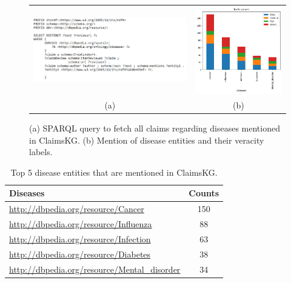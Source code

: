 \documentclass[
]{ceurart}
\begin{document}
\begin{figure}
   \begin{tabular}{cc}
         \includegraphics[width=0.65\linewidth]{table7.PNG} &\includegraphics[width=0.30\linewidth]{diseases.png}  \\
         (a) & (b) 
   \end{tabular}
   \caption{(a) SPARQL query to fetch all claims regarding diseases mentioned in ClaimsKG. (b) Mention of disease entities and their veracity labels. }\vspace{-4mm}
\label{fig:disease}
\vspace{-4mm}
\end{figure}
\begin{table}[ht]
\scriptsize
\caption{  Top 5 disease entities that are mentioned in ClaimsKG. } \label{disease_table}
\centering
\begin{tabular}{|l|c|}

\hline
\textbf{Diseases}                            & \textbf{Counts} \\ \hline
\url{http://dbpedia.org/resource/Cancer }          & 150             \\ \hline
\url{http://dbpedia.org/resource/Influenza}        & 88              \\ \hline
\url{http://dbpedia.org/resource/Infection }       & 63              \\ \hline
\url{http://dbpedia.org/resource/Diabetes }        & 38              \\ \hline
\url{http://dbpedia.org/resource/Mental\_disorder} & 34              \\ \hline

\end{tabular}
\vspace{-4mm}
\end{table}
\vspace{-2mm}
\end{document}
